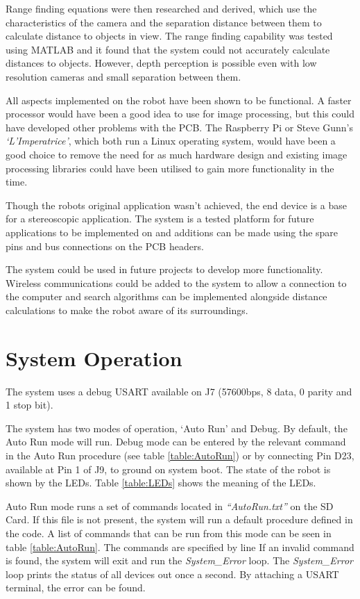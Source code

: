 Range finding equations were then researched and derived, which use the characteristics of the camera and the separation distance between them to calculate distance to objects in view. The range finding capability was tested using MATLAB and it found that the system could not accurately calculate distances to objects. However, depth perception is possible even with low resolution cameras and small separation between them.

All aspects implemented on the robot have been shown to be functional. A faster processor would have been a good idea to use for image processing, but this could have developed other problems with the PCB. The Raspberry Pi or Steve Gunn's \textit{`L'Imperatrice'}, which both run a Linux operating system, would have been a good choice to remove the need for as much hardware design and existing image processing libraries could have been utilised to gain more functionality in the time. 

Though the robots original application wasn't achieved, the end device is a base for a stereoscopic application. The system is a tested platform for future applications to be implemented on and additions can be made using the spare pins and bus connections on the PCB headers. 

The system could be used in future projects to develop more functionality. Wireless communications could be added to the system to allow a connection to the computer and search algorithms can be implemented alongside distance calculations to make the robot aware of its surroundings. 

\section{System Operation}

The system uses a debug USART available on J7 (57600bps, 8 data, 0 parity and 1 stop bit).

The system has two modes of operation, `Auto Run' and Debug. By default, the Auto Run mode will run. Debug mode can be entered by the relevant command in the Auto Run procedure (see table \ref{table:AutoRun}) or by connecting Pin D23, available at Pin 1 of J9, to ground on system boot. The state of the robot is shown by the LEDs. Table \ref{table:LEDs} shows the meaning of the LEDs.

Auto Run mode runs a set of commands located in \textit{``AutoRun.txt''} on the SD Card. If this file is not present, the system will run a default procedure defined in the code. A list of commands that can be run from this mode can be seen in table \ref{table:AutoRun}. The commands are specified by line If an invalid command is found, the system will exit and run the \textit{System\_Error} loop. The  \textit{System\_Error} loop prints the status of all devices out once a second. By attaching a USART terminal, the error can be found.

